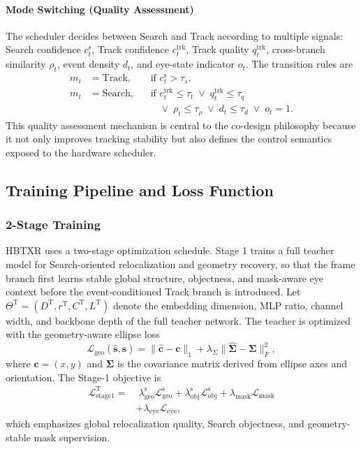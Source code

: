 \documentclass[journal]{IEEEtran}
\begin{document}
\paragraph*{Mode Switching (Quality Assessment)}
The scheduler decides between Search and Track according to multiple signals: Search confidence $c_t^{\mathrm{s}}$, Track confidence $c_t^{\mathrm{trk}}$, Track quality $q_t^{\mathrm{trk}}$, cross-branch similarity $\rho_t$, event density $d_t$, and eye-state indicator $o_t$. The transition rules are
\begin{align}
m_t &= \mathrm{Track}, && \text{if } c_t^{\mathrm{s}} > \tau_s, \\
m_t &= \mathrm{Search}, && \text{if } c_t^{\mathrm{trk}}\le\tau_t
\;\vee\; q_t^{\mathrm{trk}}\le\tau_q \nonumber\\
&&& \phantom{\text{if }} \vee\; \rho_t\le\tau_{\rho}
\;\vee\; d_t\le\tau_d
\;\vee\; o_t=1.
\end{align}
This quality assessment mechanism is central to the co-design philosophy because it not only improves tracking stability but also defines the control semantics exposed to the hardware scheduler.

\subsection{Training Pipeline and Loss Function}

\subsubsection{2-Stage Training}
HBTXR uses a two-stage optimization schedule. Stage 1 trains a full teacher model for Search-oriented relocalization and geometry recovery, so that the frame branch first learns stable global structure, objectness, and mask-aware eye context before the event-conditioned Track branch is introduced. Let $\Theta^{\mathrm{T}}=(D^{\mathrm{T}}, r^{\mathrm{T}}, C^{\mathrm{T}}, L^{\mathrm{T}})$ denote the embedding dimension, MLP ratio, channel width, and backbone depth of the full teacher network. The teacher is optimized with the geometry-aware ellipse loss
\begin{equation}
\mathcal L_{\mathrm{geo}}(\hat{\mathbf s},\mathbf s)=
\|\hat{\mathbf c}-\mathbf c\|_1 + \lambda_{\Sigma}\|\hat{\bm\Sigma}-\bm\Sigma\|_F^2,
\end{equation}
where $\mathbf c=(x,y)$ and $\bm\Sigma$ is the covariance matrix derived from ellipse axes and orientation. The Stage-1 objective is
\begin{align}
\mathcal L_{\mathrm{stage1}}^{\mathrm{T}} =
&\;\lambda_{\mathrm{geo}}^{\mathrm{s}}\mathcal L_{\mathrm{geo}}^{\mathrm{s}}
+ \lambda_{\mathrm{obj}}^{\mathrm{s}}\mathcal L_{\mathrm{obj}}^{\mathrm{s}}
+ \lambda_{\mathrm{mask}}\mathcal L_{\mathrm{mask}}
\nonumber\\
&+ \lambda_{\mathrm{eye}}\mathcal L_{\mathrm{eye}},
\end{align}
which emphasizes global relocalization quality, Search objectness, and geometry-stable mask supervision.
\end{document}
